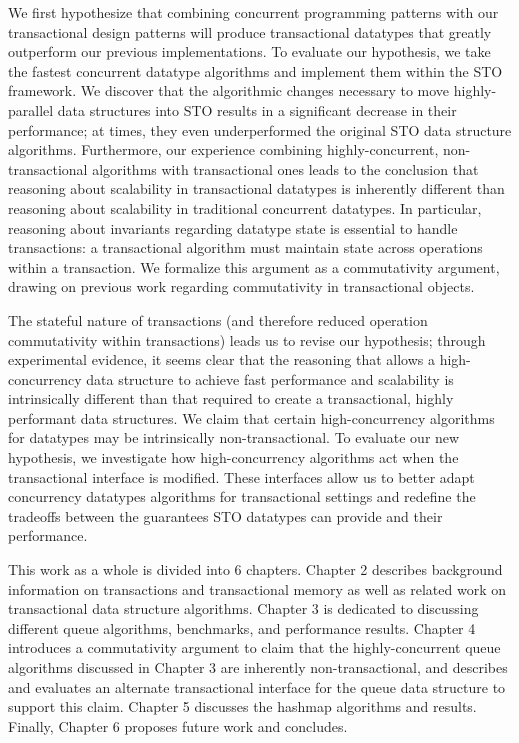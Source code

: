 We first hypothesize that combining concurrent programming patterns with our transactional design patterns will produce transactional datatypes that greatly outperform our previous implementations. To evaluate our hypothesis, we take the fastest concurrent datatype algorithms and implement them within the STO framework. We discover that the algorithmic changes necessary to move highly-parallel data structures into STO results in a significant decrease in their performance; at times, they even underperformed the original STO data structure algorithms. Furthermore, our experience combining highly-concurrent, non-transactional algorithms with transactional ones leads to the conclusion that reasoning about scalability in transactional datatypes is inherently different than reasoning about scalability in traditional concurrent datatypes. In particular, reasoning about invariants regarding datatype state is essential to handle transactions: a transactional algorithm must maintain state across operations within a transaction. We formalize this argument as a commutativity argument, drawing on previous work regarding commutativity in transactional objects\cite{weihl}.

The stateful nature of transactions (and therefore reduced operation commutativity within transactions) leads us to revise our hypothesis; through experimental evidence, it seems clear that the reasoning that allows a high-concurrency data structure to achieve fast performance and scalability is intrinsically different than that required to create a transactional, highly performant data structures. We claim that certain high-concurrency algorithms for datatypes may be intrinsically non-transactional. To evaluate our new hypothesis, we investigate how high-concurrency algorithms act when the transactional interface is modified. These interfaces allow us to better adapt concurrency datatypes algorithms for transactional settings and redefine the tradeoffs between the guarantees STO datatypes can provide and their performance.

This work as a whole is divided into 6 chapters. Chapter 2 describes background information on transactions and transactional memory as well as related work on transactional data structure algorithms. Chapter 3 is dedicated to discussing different queue algorithms, benchmarks, and performance results. Chapter 4 introduces a commutativity argument to claim that the highly-concurrent queue algorithms discussed in Chapter 3 are inherently non-transactional, and describes and evaluates an alternate transactional interface for the queue data structure to support this claim. Chapter 5 discusses the hashmap algorithms and results. Finally, Chapter 6 proposes future work and concludes.
